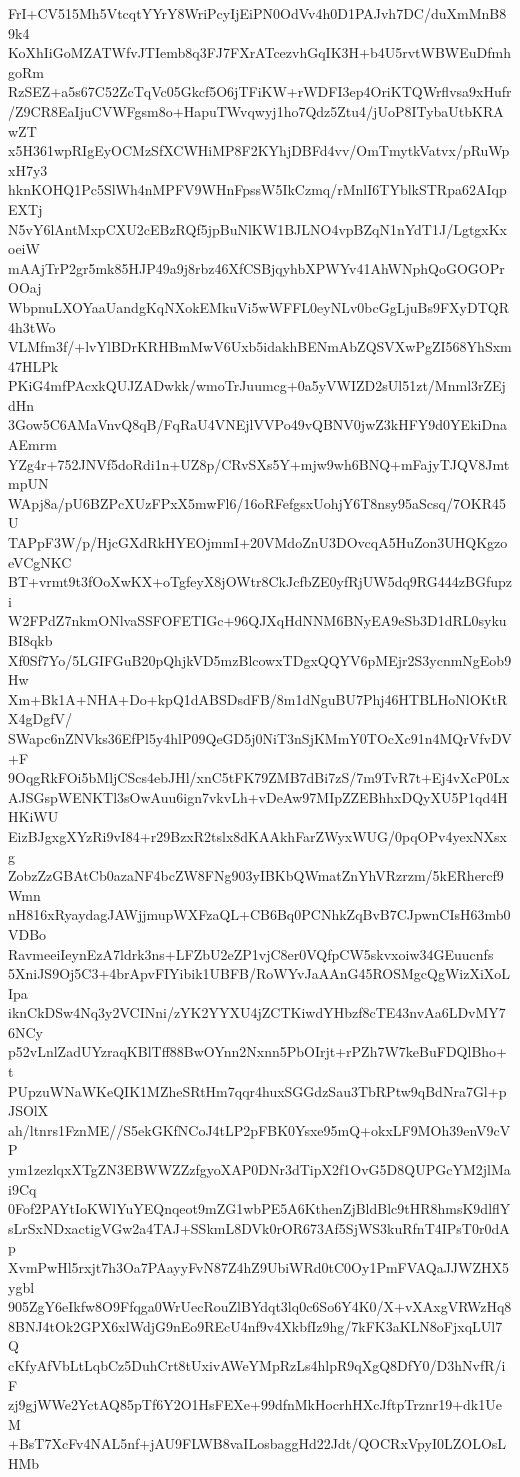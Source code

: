 FrI+CV515Mh5VtcqtYYrY8WriPcyIjEiPN0OdVv4h0D1PAJvh7DC/duXmMnB89k4
KoXhIiGoMZATWfvJTIemb8q3FJ7FXrATcezvhGqIK3H+b4U5rvtWBWEuDfmhgoRm
RzSEZ+a5s67C52ZcTqVc05Gkcf5O6jTFiKW+rWDFI3ep4OriKTQWrflvsa9xHufr
/Z9CR8EaIjuCVWFgsm8o+HapuTWvqwyj1ho7Qdz5Ztu4/jUoP8ITybaUtbKRAwZT
x5H361wpRIgEyOCMzSfXCWHiMP8F2KYhjDBFd4vv/OmTmytkVatvx/pRuWpxH7y3
hknKOHQ1Pc5SlWh4nMPFV9WHnFpssW5IkCzmq/rMnlI6TYblkSTRpa62AIqpEXTj
N5vY6lAntMxpCXU2cEBzRQf5jpBuNlKW1BJLNO4vpBZqN1nYdT1J/LgtgxKxoeiW
mAAjTrP2gr5mk85HJP49a9j8rbz46XfCSBjqyhbXPWYv41AhWNphQoGOGOPrOOaj
WbpnuLXOYaaUandgKqNXokEMkuVi5wWFFL0eyNLv0bcGgLjuBs9FXyDTQR4h3tWo
VLMfm3f/+lvYlBDrKRHBmMwV6Uxb5idakhBENmAbZQSVXwPgZI568YhSxm47HLPk
PKiG4mfPAcxkQUJZADwkk/wmoTrJuumcg+0a5yVWIZD2sUl51zt/Mnml3rZEjdHn
3Gow5C6AMaVnvQ8qB/FqRaU4VNEjlVVPo49vQBNV0jwZ3kHFY9d0YEkiDnaAEmrm
YZg4r+752JNVf5doRdi1n+UZ8p/CRvSXs5Y+mjw9wh6BNQ+mFajyTJQV8JmtmpUN
WApj8a/pU6BZPcXUzFPxX5mwFl6/16oRFefgsxUohjY6T8nsy95aScsq/7OKR45U
TAPpF3W/p/HjcGXdRkHYEOjmmI+20VMdoZnU3DOvcqA5HuZon3UHQKgzoeVCgNKC
BT+vrmt9t3fOoXwKX+oTgfeyX8jOWtr8CkJcfbZE0yfRjUW5dq9RG444zBGfupzi
W2FPdZ7nkmONlvaSSFOFETIGc+96QJXqHdNNM6BNyEA9eSb3D1dRL0sykuBI8qkb
Xf0Sf7Yo/5LGIFGuB20pQhjkVD5mzBlcowxTDgxQQYV6pMEjr2S3ycnmNgEob9Hw
Xm+Bk1A+NHA+Do+kpQ1dABSDsdFB/8m1dNguBU7Phj46HTBLHoNlOKtRX4gDgfV/
SWapc6nZNVks36EfPl5y4hlP09QeGD5j0NiT3nSjKMmY0TOcXc91n4MQrVfvDV+F
9OqgRkFOi5bMljCScs4ebJHl/xnC5tFK79ZMB7dBi7zS/7m9TvR7t+Ej4vXcP0Lx
AJSGspWENKTl3sOwAuu6ign7vkvLh+vDeAw97MIpZZEBhhxDQyXU5P1qd4HHKiWU
EizBJgxgXYzRi9vI84+r29BzxR2tslx8dKAAkhFarZWyxWUG/0pqOPv4yexNXsxg
ZobzZzGBAtCb0azaNF4bcZW8FNg903yIBKbQWmatZnYhVRzrzm/5kERhercf9Wmn
nH816xRyaydagJAWjjmupWXFzaQL+CB6Bq0PCNhkZqBvB7CJpwnCIsH63mb0VDBo
RavmeeiIeynEzA7ldrk3ns+LFZbU2eZP1vjC8er0VQfpCW5skvxoiw34GEuucnfs
5XniJS9Oj5C3+4brApvFIYibik1UBFB/RoWYvJaAAnG45ROSMgcQgWizXiXoLIpa
iknCkDSw4Nq3y2VCINni/zYK2YYXU4jZCTKiwdYHbzf8cTE43nvAa6LDvMY76NCy
p52vLnlZadUYzraqKBlTff88BwOYnn2Nxnn5PbOIrjt+rPZh7W7keBuFDQlBho+t
PUpzuWNaWKeQIK1MZheSRtHm7qqr4huxSGGdzSau3TbRPtw9qBdNra7Gl+pJSOlX
ah/ltnrs1FznME//S5ekGKfNCoJ4tLP2pFBK0Ysxe95mQ+okxLF9MOh39enV9cVP
ym1zezlqxXTgZN3EBWWZZzfgyoXAP0DNr3dTipX2f1OvG5D8QUPGcYM2jlMai9Cq
0Fof2PAYtIoKWlYuYEQnqeot9mZG1wbPE5A6KthenZjBldBlc9tHR8hmsK9dlflY
sLrSxNDxactigVGw2a4TAJ+SSkmL8DVk0rOR673Af5SjWS3kuRfnT4IPsT0r0dAp
XvmPwHl5rxjt7h3Oa7PAayyFvN87Z4hZ9UbiWRd0tC0Oy1PmFVAQaJJWZHX5ygbl
905ZgY6eIkfw8O9Ffqga0WrUecRouZlBYdqt3lq0c6So6Y4K0/X+vXAxgVRWzHq8
8BNJ4tOk2GPX6xlWdjG9nEo9REcU4nf9v4XkbfIz9hg/7kFK3aKLN8oFjxqLUl7Q
cKfyAfVbLtLqbCz5DuhCrt8tUxivAWeYMpRzLs4hlpR9qXgQ8DfY0/D3hNvfR/iF
zj9gjWWe2YctAQ85pTf6Y2O1HsFEXe+99dfnMkHocrhHXcJftpTrznr19+dk1UeM
+BsT7XcFv4NAL5nf+jAU9FLWB8vaILosbaggHd22Jdt/QOCRxVpyI0LZOLOsLHMb
